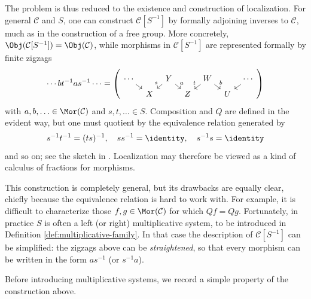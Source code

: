 The problem is thus reduced to the existence and construction of localization.
For general $\mathcal{C}$ and $S$, one can construct $\mathcal{C}[S^{-1}]$ by
formally adjoining inverses to $\mathcal{C}$, much as in the construction of a
free group. More concretely,
$\Obj(\mathcal{C}[S^{-1}])=\Obj(\mathcal{C})$, while morphisms in
$\mathcal{C}[S^{-1}]$ are represented formally by finite zigzags
\[ \cdots b t^{-1} a s^{-1} \cdots = \left(
	\begin{tikzcd}[row sep=tiny, column sep=tiny]
	\cdots \arrow[rd] & & Y \arrow[ld, "s"'] \arrow[rd, "a"] & & W \arrow[ld, "t"'] \arrow[rd, "b"] & & \cdots \arrow[ld] \\
	& X & & Z & & U &
\end{tikzcd}\right) \]
with $a,b,\ldots\in\Mor(\mathcal{C})$ and $s,t,\ldots\in S$. Composition
and $Q$ are defined in the evident way, but one must quotient by the
equivalence relation generated by
\[ s^{-1}t^{-1}=(ts)^{-1}, \quad ss^{-1}=\identity, \quad s^{-1}s=\identity \]
and so on; see the sketch in \cite[I.1.1]{GZ67}. Localization may therefore be
viewed as a kind of calculus of fractions for morphisms.

This construction is completely general, but its drawbacks are equally clear,
chiefly because the equivalence relation is hard to work with. For example, it
is difficult to characterize those $f,g\in\Mor(\mathcal{C})$ for which
$Qf=Qg$. Fortunately, in practice $S$ is often a left (or right)
multiplicative system, to be introduced in Definition
\ref{def:multiplicative-family}. In that case the description of
$\mathcal{C}[S^{-1}]$ can be simplified: the zigzags above can be
\emph{straightened}, so that every morphism can be written in the form
$as^{-1}$ (or $s^{-1}a$).

Before introducing multiplicative systems, we record a simple property of the
construction above.

